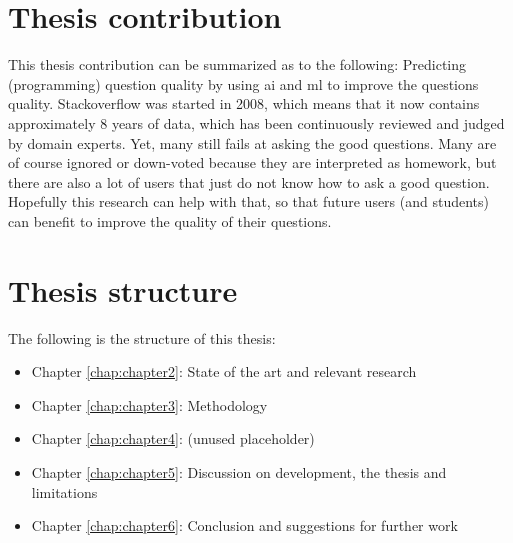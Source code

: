\section{Thesis contribution}
\label{sec:thesis_contribution}
This thesis contribution can be summarized as to the following: Predicting (programming) question quality by 
 using \gls{ai} and \gls{ml} to improve the questions quality. Stackoverflow was started in 2008, which means 
 that it now contains approximately 8 years of data, which has been continuously reviewed and judged by domain 
 experts. Yet, many still fails at asking the good questions. Many are of course ignored or down-voted because 
 they are interpreted as homework, but there are also a lot of users that just do not know how to ask a good 
 question. Hopefully this research can help with that, so that future users (and students) can benefit to 
 improve the quality of their questions.

\section{Thesis structure}
\label{sec:thesis_structure}
The following is the structure of this thesis:
\begin{itemize}
	\item Chapter \ref{chap:chapter2}: State of the art and relevant research
	\item Chapter \ref{chap:chapter3}: Methodology 
	\item Chapter \ref{chap:chapter4}: (unused placeholder)
	\item Chapter \ref{chap:chapter5}: Discussion on development, the thesis and limitations
	\item Chapter \ref{chap:chapter6}: Conclusion and suggestions for further work
\end{itemize}
